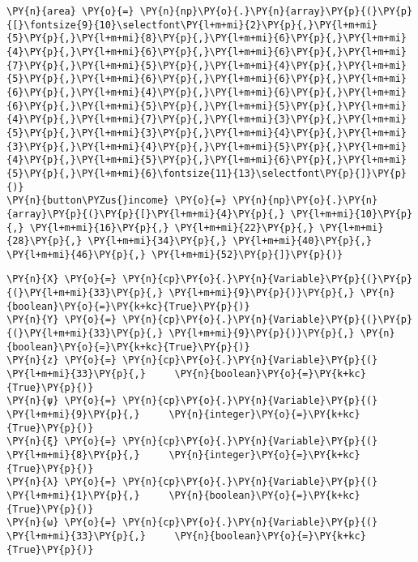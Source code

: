 \begin{tcolorbox}[breakable, size=fbox, boxrule=1pt, pad at break*=1mm,colback=cellbackground, colframe=cellborder]
\begin{Verbatim}[commandchars=\\\{\}]
\PY{n}{area} \PY{o}{=} \PY{n}{np}\PY{o}{.}\PY{n}{array}\PY{p}{(}\PY{p}{[}\fontsize{9}{10}\selectfont\PY{l+m+mi}{2}\PY{p}{,}\PY{l+m+mi}{5}\PY{p}{,}\PY{l+m+mi}{8}\PY{p}{,}\PY{l+m+mi}{6}\PY{p}{,}\PY{l+m+mi}{4}\PY{p}{,}\PY{l+m+mi}{6}\PY{p}{,}\PY{l+m+mi}{6}\PY{p}{,}\PY{l+m+mi}{7}\PY{p}{,}\PY{l+m+mi}{5}\PY{p}{,}\PY{l+m+mi}{4}\PY{p}{,}\PY{l+m+mi}{5}\PY{p}{,}\PY{l+m+mi}{6}\PY{p}{,}\PY{l+m+mi}{6}\PY{p}{,}\PY{l+m+mi}{6}\PY{p}{,}\PY{l+m+mi}{4}\PY{p}{,}\PY{l+m+mi}{6}\PY{p}{,}\PY{l+m+mi}{6}\PY{p}{,}\PY{l+m+mi}{5}\PY{p}{,}\PY{l+m+mi}{5}\PY{p}{,}\PY{l+m+mi}{4}\PY{p}{,}\PY{l+m+mi}{7}\PY{p}{,}\PY{l+m+mi}{3}\PY{p}{,}\PY{l+m+mi}{5}\PY{p}{,}\PY{l+m+mi}{3}\PY{p}{,}\PY{l+m+mi}{4}\PY{p}{,}\PY{l+m+mi}{3}\PY{p}{,}\PY{l+m+mi}{4}\PY{p}{,}\PY{l+m+mi}{5}\PY{p}{,}\PY{l+m+mi}{4}\PY{p}{,}\PY{l+m+mi}{5}\PY{p}{,}\PY{l+m+mi}{6}\PY{p}{,}\PY{l+m+mi}{5}\PY{p}{,}\PY{l+m+mi}{6}\fontsize{11}{13}\selectfont\PY{p}{]}\PY{p}{)}
\PY{n}{button\PYZus{}income} \PY{o}{=} \PY{n}{np}\PY{o}{.}\PY{n}{array}\PY{p}{(}\PY{p}{[}\PY{l+m+mi}{4}\PY{p}{,} \PY{l+m+mi}{10}\PY{p}{,} \PY{l+m+mi}{16}\PY{p}{,} \PY{l+m+mi}{22}\PY{p}{,} \PY{l+m+mi}{28}\PY{p}{,} \PY{l+m+mi}{34}\PY{p}{,} \PY{l+m+mi}{40}\PY{p}{,} \PY{l+m+mi}{46}\PY{p}{,} \PY{l+m+mi}{52}\PY{p}{]}\PY{p}{)}
    \end{Verbatim}
\end{tcolorbox}

\fontsize{10.95}{13.6}\selectfont

\begin{tcolorbox}[breakable, size=fbox, boxrule=1pt, pad at break*=1mm,colback=cellbackground, colframe=cellborder]
    \begin{Verbatim}[commandchars=\\\{\}]
\PY{n}{X} \PY{o}{=} \PY{n}{cp}\PY{o}{.}\PY{n}{Variable}\PY{p}{(}\PY{p}{(}\PY{l+m+mi}{33}\PY{p}{,} \PY{l+m+mi}{9}\PY{p}{)}\PY{p}{,} \PY{n}{boolean}\PY{o}{=}\PY{k+kc}{True}\PY{p}{)}
\PY{n}{Y} \PY{o}{=} \PY{n}{cp}\PY{o}{.}\PY{n}{Variable}\PY{p}{(}\PY{p}{(}\PY{l+m+mi}{33}\PY{p}{,} \PY{l+m+mi}{9}\PY{p}{)}\PY{p}{,} \PY{n}{boolean}\PY{o}{=}\PY{k+kc}{True}\PY{p}{)}
\PY{n}{z} \PY{o}{=} \PY{n}{cp}\PY{o}{.}\PY{n}{Variable}\PY{p}{(} \PY{l+m+mi}{33}\PY{p}{,}     \PY{n}{boolean}\PY{o}{=}\PY{k+kc}{True}\PY{p}{)}
\PY{n}{ψ} \PY{o}{=} \PY{n}{cp}\PY{o}{.}\PY{n}{Variable}\PY{p}{(}  \PY{l+m+mi}{9}\PY{p}{,}     \PY{n}{integer}\PY{o}{=}\PY{k+kc}{True}\PY{p}{)}
\PY{n}{ξ} \PY{o}{=} \PY{n}{cp}\PY{o}{.}\PY{n}{Variable}\PY{p}{(}  \PY{l+m+mi}{8}\PY{p}{,}     \PY{n}{integer}\PY{o}{=}\PY{k+kc}{True}\PY{p}{)}
\PY{n}{λ} \PY{o}{=} \PY{n}{cp}\PY{o}{.}\PY{n}{Variable}\PY{p}{(}  \PY{l+m+mi}{1}\PY{p}{,}     \PY{n}{boolean}\PY{o}{=}\PY{k+kc}{True}\PY{p}{)}
\PY{n}{ω} \PY{o}{=} \PY{n}{cp}\PY{o}{.}\PY{n}{Variable}\PY{p}{(} \PY{l+m+mi}{33}\PY{p}{,}     \PY{n}{boolean}\PY{o}{=}\PY{k+kc}{True}\PY{p}{)}
    \end{Verbatim}
\end{tcolorbox}


